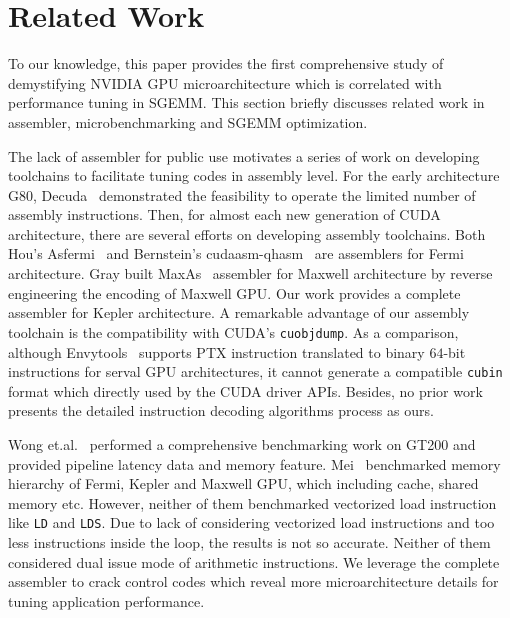 \section{Related Work}
\label{sec:related}
To our knowledge, this paper provides the first comprehensive study of demystifying NVIDIA GPU microarchitecture which 
is correlated with performance tuning in SGEMM. This section briefly discusses related work in assembler, 
microbenchmarking and SGEMM optimization.

The lack of assembler for public use motivates a series of work on developing toolchains to facilitate tuning codes in 
assembly level. For the early architecture G80, Decuda~\cite{decuda} demonstrated the feasibility to operate the 
limited number of assembly instructions. Then, for almost each new generation of CUDA architecture, there are several 
efforts on developing assembly toolchains. Both Hou's Asfermi~\cite{asfermi} and Bernstein's 
cudaasm-qhasm~\cite{bernstein2012usable} are assemblers for Fermi architecture. Gray built MaxAs~\cite{maxas} assembler 
for Maxwell architecture by reverse engineering the encoding of Maxwell GPU. Our work provides a complete assembler for 
Kepler architecture. A remarkable advantage of our assembly toolchain is the compatibility with CUDA's {\tt cuobjdump}. 
As a comparison, although Envytools~\cite{envytools} supports PTX instruction translated to binary $64$-bit 
instructions for serval GPU architectures, it cannot generate a compatible {\tt cubin} format which directly used by 
the CUDA driver APIs. Besides, no prior work presents the detailed instruction decoding algorithms process as ours.

Wong et.al.~\cite{wong} performed a 
comprehensive benchmarking work on GT200 and provided pipeline latency data and
memory feature. Mei~\cite{mei} benchmarked memory hierarchy
of Fermi, Kepler and Maxwell GPU, which including cache, shared memory etc. However, neither of them benchmarked 
vectorized load instruction like {\tt LD} and {\tt LDS}. Due to lack of considering vectorized load instructions and 
too less instructions inside the loop, the results is not so accurate. Neither of them considered dual issue mode of 
arithmetic instructions. We leverage the complete assembler to crack control codes which reveal more 
microarchitecture details for tuning application performance.

